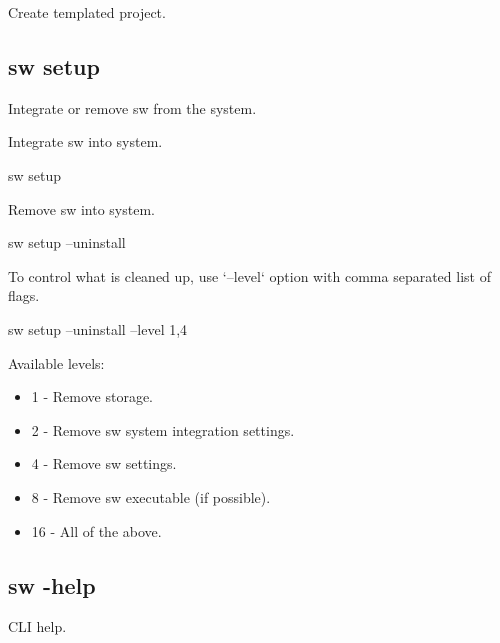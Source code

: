 Create templated project.

\subsection{sw setup}

Integrate or remove sw from the system.

Integrate sw into system.

\begin{command}
sw setup
\end{command}

Remove sw into system.

\begin{command}
sw setup --uninstall
\end{command}

To control what is cleaned up, use `--level` option with comma separated list of flags.

\begin{command}
sw setup --uninstall --level 1,4
\end{command}

Available levels:
\begin{itemize}
\item 1 - Remove storage.
\item 2 - Remove sw system integration settings.
\item 4 - Remove sw settings.
\item 8 - Remove sw executable (if possible).
\item 16 - All of the above.
\end{itemize}


\subsection{sw -help}

CLI help.

